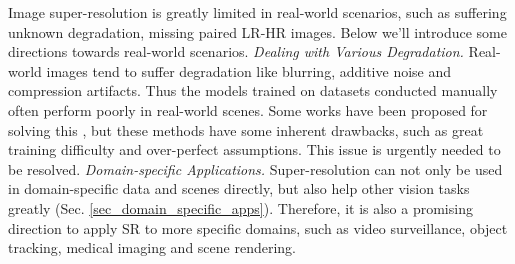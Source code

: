 {Image super-resolution is greatly limited in real-world scenarios, such as suffering unknown degradation, missing paired LR-HR images.
Below we'll introduce some directions towards real-world scenarios.
\textit{Dealing with Various Degradation.}
Real-world images tend to suffer degradation like blurring, additive noise and compression artifacts.
Thus the models trained on datasets conducted manually often perform poorly in real-world scenes.
Some works have been proposed for solving this , but these methods have some inherent drawbacks, such as great training difficulty and over-perfect assumptions.
This issue is urgently needed to be resolved.
\textit{Domain-specific Applications.}
Super-resolution can not only be used in domain-specific data and scenes directly, but also help other vision tasks greatly (Sec. \ref{sec_domain_specific_apps}).
Therefore, it is also a promising direction to apply SR to more specific domains, such as video surveillance, object tracking, medical imaging and scene rendering.
\appendices
\ifCLASSOPTIONcaptionsoff
    \newpage
\fi
}
